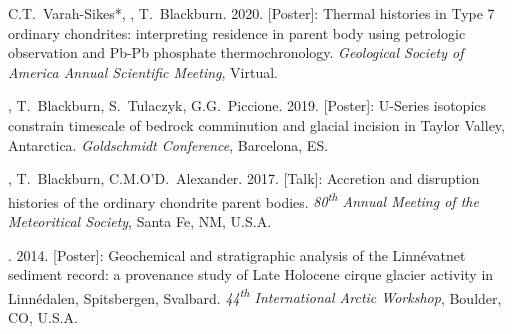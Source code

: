 \begin{etaremune}[leftmargin=3ex]
  \item C.T.~Varah-Sikes*, \ghedwards, T.~Blackburn. 2020. [Poster]: Thermal histories in Type 7 ordinary chondrites: interpreting residence in parent body using petrologic observation and Pb-Pb phosphate thermochronology. \textit{Geological Society of America Annual Scientific Meeting}, Virtual.

  \item  \ghedwards, T.~Blackburn, S.~Tulaczyk, G.G.~Piccione. 2019. [Poster]: U-Series isotopics constrain timescale of bedrock comminution and glacial incision in Taylor Valley, Antarctica. \textit{Goldschmidt Conference}, Barcelona, ES.


  \item  \ghedwards, T.~Blackburn, C.M.O’D.~Alexander. 2017. [Talk]: Accretion and disruption histories of the ordinary chondrite parent bodies. \textit{80\textsuperscript{th} Annual Meeting of the Meteoritical Society}, Santa Fe, NM, U.S.A.

  \item \ghedwards. 2014. [Poster]: Geochemical and stratigraphic analysis of the Linnévatnet sediment record: a provenance study of Late Holocene cirque glacier activity in Linnédalen, Spitsbergen, Svalbard. \textit{44\textsuperscript{th} International Arctic Workshop}, Boulder, CO, U.S.A.
\end{etaremune}


 



